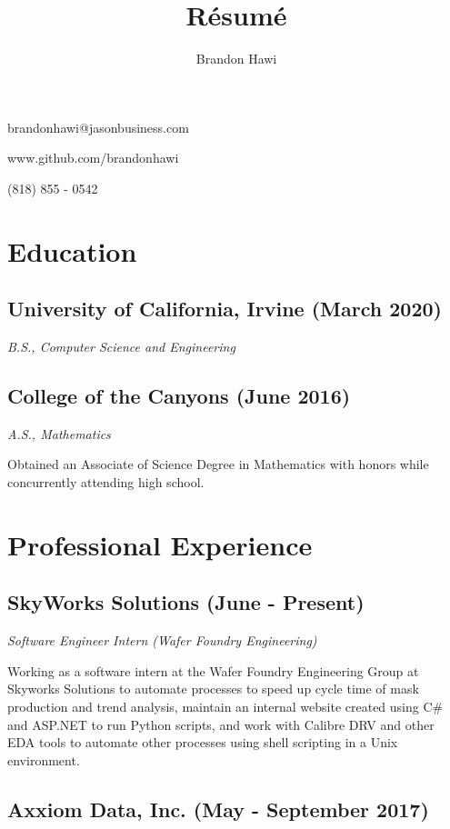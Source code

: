 \documentclass{article}
\makeatletter
\renewcommand{\maketitle}
{
\begin{flushleft}
\huge
\textbf{\theauthor}
\small

brandonhawi@jasonbusiness.com

www.github.com/brandonhawi

(818) 855 - 0542
\end{flushleft}
}
\makeatother
\begin{document}
\title{R\'esum\'e}
\author{Brandon Hawi}

\maketitle
\vspace{-0.1in}
\section{Education}

\subsection{University of California, Irvine (March 2020)}
\noindent\textit{B.S., Computer Science and Engineering}

\subsection{College of the Canyons (June 2016)}
\noindent\textit{A.S., Mathematics}

Obtained an Associate of Science Degree in Mathematics with honors while concurrently attending
high school.

\section{Professional Experience}

%
%
%

\subsection{SkyWorks Solutions (June - Present)}

\noindent\textit{Software Engineer Intern (Wafer Foundry Engineering)}

Working as a software intern at the Wafer Foundry Engineering Group at Skyworks Solutions to 
automate processes to speed up cycle time of mask production and trend analysis, maintain an internal website 
created using C\# and ASP.NET to run Python scripts, and work with Calibre DRV and other EDA tools to 
automate other processes using shell scripting in a Unix environment.

\subsection{Axxiom Data, Inc. (May - September 2017)}
\end{document}
